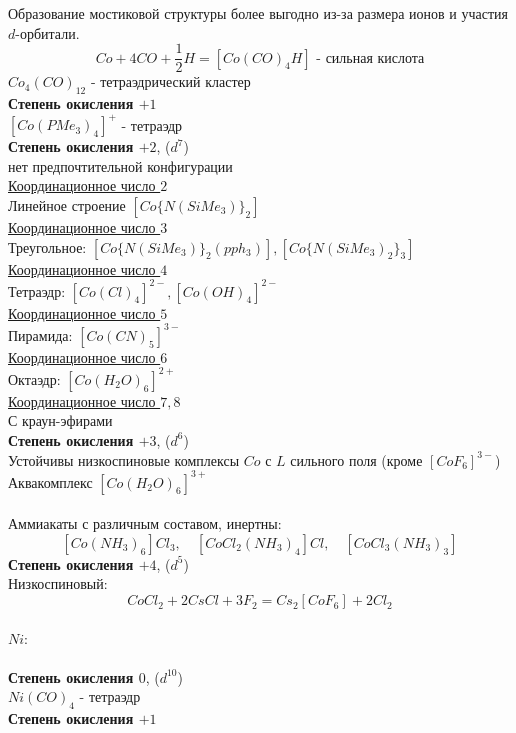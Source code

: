 Образование мостиковой структуры более выгодно из-за размера ионов и участия $d$-орбитали.
\[
Co + 4CO + \frac12 H =   \left[Co(CO)_4 H \right] \text{ - сильная кислота}
\]
$Co_4(CO)_{12}$ - тетраэдрический кластер \\
\textbf{Степень окисления $+1$} \\
$\left[Co(PMe_3)_4\right]^+$ - тетраэдр \\
\textbf{Степень окисления $+2$}, ($d^7$)\\
нет предпочтительной конфигурации \\
\ul{Координационное число $2$} \\
Линейное строение $\left[ Co\{ N (SiMe_3) \}_2 \right]$ \\
\ul{Координационное число $3$} \\
Треугольное: $\left[ Co\{ N (SiMe_3) \}_2 (pph_3)\right], \left[ Co\{ N (SiMe_3)_2 \}_3 \right] $    \\
\ul{Координационное число $4$} \\
Тетраэдр: $\left[Co(Cl)_4 \right]^{2-}, \left[Co(OH)_4 \right]^{2-}  $ \\ 
\ul{Координационное число $5$} \\
Пирамида: $\left[Co(CN)_5 \right]^{3-}$   \\
\ul{Координационное число $6$} \\
Октаэдр: $\left[Co(H_2O)_6 \right]^{2+}$    \\
\ul{Координационное число $7,8$} \\
С краун-эфирами \\
\textbf{Степень окисления $+3$}, ($d^6$)\\
Устойчивы низкоспиновые комплексы $Co$ с $L$ сильного поля (кроме $\left[CoF_6 \right]^{3-}$) \\
Аквакомплекс $\left[Co(H_2O)_6 \right]^{3+}$ \\ \\
Аммиакаты с различным составом, инертны:
\[
\left[Co(NH_3)_6 \right]Cl_3, \quad \left[CoCl_2(NH_3)_4 \right]Cl, \quad \left[CoCl_3(NH_3)_3 \right]
\]
\textbf{Степень окисления $+4$}, ($d^5$)\\ 
Низкоспиновый:
\[
CoCl_2 + 2CsCl + 3 F_2 = Cs_2\left[CoF_6 \right] + 2Cl_2
\] \\ 
$Ni$: \\ \\
\textbf{Степень окисления $0$}, ($d^10$)\\
$Ni(CO)_4$ - тетраэдр \\
\textbf{Степень окисления $+1$}\\
